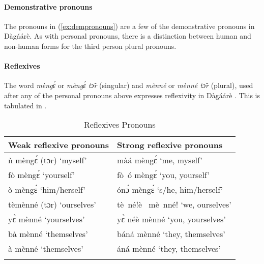 \paragraph{Demonstrative pronouns}

The pronouns in (\ref{ex:dempronouns}) are a few of the demonstrative pronouns in Dàgáárè. As
with personal pronouns, there is a distinction between human and non-human forms for the
third person plural pronouns.



\paragraph{Reflexives}
The word \textit{mèngɛ́} or \textit{mèngɛ́ tɔ̌r} (singular) and \textit{mènné} or \textit{mènné tɔ̌r} (plural), used
after any of the personal pronouns above expresses reflexivity in Dàgáárè . This is tabulated
in .

\begin{table}
    
    \begin{tabular}{ll}\lsptoprule
Weak reflexive pronouns &  Strong reflexive pronouns \\\midrule
ǹ mèngɛ́ (tɔr) ‘myself’     & màá mèngɛ́ ‘me, myself’\\
fò mèngɛ́  ‘yourself’&fò~ó mèngɛ́ ‘you, yourself’\\
ò mèngɛ́  ‘him/herself’ &  ónɔ́ mèngɛ́ ‘s/he, him/herself’\\
tèmènné (tɔr) ‘ourselves’ &    tè~né!è~ mè~nné! ‘we, ourselves'\\
yɛ̀ mènné ‘yourselves’& yɛ̀ néè mènné ‘you, yourselves'\\
bà mènné ‘themselves’& báná mènné ‘they, themselves’ \\
à mènné ‘themselves’&áná mènné ‘they, themselves’\\\lspbottomrule
    \end{tabular}
    \caption{Reflexives Pronouns}
    \label{tab:reflexives}
\end{table}  


